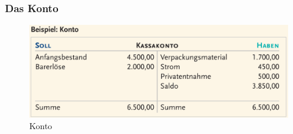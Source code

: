 \documentclass[a4paper, ngerman]{article}
\begin{document}
\subsubsection{Das Konto}
\begin{figure}[h]
    \centering
    \includegraphics[scale=0.3]{pics/Konto.png}
    \caption{Konto}
\end{figure}
\end{document}

